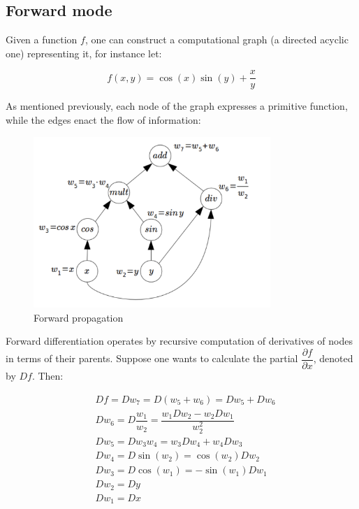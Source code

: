 \documentclass{pracamgr}
\numberwithin{equation}{section}
\begin{document}
\subsection{Forward mode}

Given a function $f$, one can construct a computational graph (a directed acyclic one) representing it, for instance let:

\[ f(x,y) = \cos(x) \sin(y) + \dfrac{x}{y} \]

As mentioned previously, each node of the graph expresses a primitive function, while the edges enact the flow of information:

\begin{figure}[H]
\centering
\includegraphics[width=0.8\textwidth,height=0.8\textheight,keepaspectratio]{Aut_diff}
\caption[Forward propagation]{Forward propagation\footnotemark}
\label{Forward_propagation}
\end{figure}


Forward differentiation operates by recursive computation of derivatives of nodes in terms of their parents. Suppose one wants to calculate the partial $\dfrac{\partial f}{\partial x}$, denoted by $Df$. Then:

\begin{align*}
& Df = Dw_{7} = D(w_{5} + w_{6}) = Dw_{5} + Dw_{6} \\
& Dw_{6} = D\dfrac{w_{1}}{w_{2}} = \dfrac{w_{1}Dw_{2}- w_{2}Dw_{1}}{w_{2}^{2}}  \\
& Dw_{5} = Dw_{3}w_{4} = w_{3}Dw_{4} + w_{4}Dw_{3} \\
& Dw_{4} = D\sin(w_{2}) = \cos(w_{2}) Dw_{2} \\
& Dw_{3} = D\cos(w_{1}) = -\sin(w_{1}) Dw_{1} \\
& Dw_{2} = Dy \\
& Dw_{1} = Dx 
\end{align*}
\end{document}

